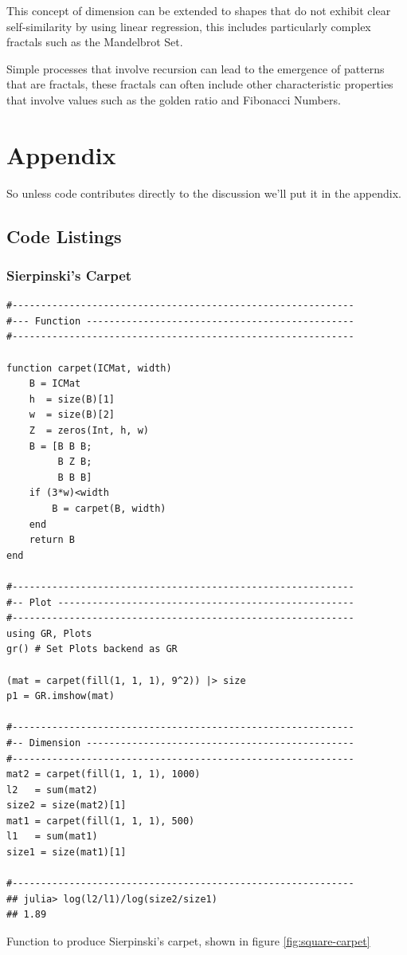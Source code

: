 \documentclass[a4paper,11pt,twoside]{article}
\begin{document}
This concept of dimension can be extended to shapes that do not exhibit clear self-similarity by using linear regression, this includes particularly complex fractals such as the Mandelbrot Set.

Simple processes that involve recursion can lead to the emergence of patterns that are fractals, these fractals can often include other characteristic properties that involve values such as the golden ratio and Fibonacci Numbers.

 \appendix 
\section{Appendix}
\label{appendix}
So unless code contributes directly to the discussion we'll put it in the appendix.
\subsection{Code Listings}
\label{sec:org4038478}
\subsubsection{Sierpinski's Carpet}
\label{sec:orge9c72aa}


\begin{listing}[htbp]
\begin{verbatim}
#------------------------------------------------------------
#--- Function -----------------------------------------------
#------------------------------------------------------------

function carpet(ICMat, width)
    B = ICMat
    h  = size(B)[1]
    w  = size(B)[2]
    Z  = zeros(Int, h, w)
    B = [B B B;
         B Z B;
         B B B]
    if (3*w)<width
        B = carpet(B, width)
    end
    return B
end

#------------------------------------------------------------
#-- Plot ----------------------------------------------------
#------------------------------------------------------------
using GR, Plots
gr() # Set Plots backend as GR

(mat = carpet(fill(1, 1, 1), 9^2)) |> size
p1 = GR.imshow(mat)

#------------------------------------------------------------
#-- Dimension -----------------------------------------------
#------------------------------------------------------------
mat2 = carpet(fill(1, 1, 1), 1000)
l2   = sum(mat2)
size2 = size(mat2)[1]
mat1 = carpet(fill(1, 1, 1), 500)
l1   = sum(mat1)
size1 = size(mat1)[1]

#------------------------------------------------------------
## julia> log(l2/l1)/log(size2/size1)
## 1.89
\end{verbatim}
\caption{\label{l-s-carpet}Function to produce Sierpinski's carpet, shown in figure \ref{fig:square-carpet}}
\end{listing}
\end{document}
